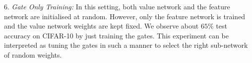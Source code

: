 \indent\quad $6.$ \emph{Gate Only Training:} In this setting, both value network and the feature network are initialised at random. However, only the feature network is trained and the value network weights are kept fixed. We observe about $65\%$ test accuracy on CIFAR-10 by just training the gates. This experiment can be interpreted as tuning the gates in such a manner to select the right sub-network of random weights.
 